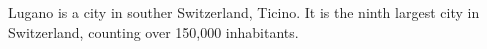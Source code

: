 Lugano is a city in souther Switzerland, Ticino.
It is the ninth largest city in Switzerland, counting over 150,000 inhabitants.